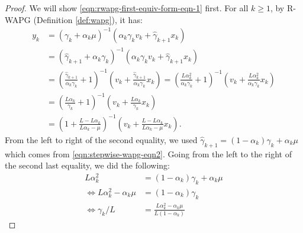 \documentclass[12pt]{article}
\begin{document}
        \begin{proof}
            {We will show \eqref{eqn:rwapg-first-equiv-form-eqn-1} first.}
            For all $k \ge 1$, by R-WAPG (Definition \ref{def:wapg}), it has:
            \begin{align*}
                y_{k} &=
                (\gamma_k + \alpha_k \mu)^{-1}
                (\alpha_k \gamma_k v_k + \hat \gamma_{k + 1}x_k)
                \\
                &=
                (\hat \gamma_{k + 1} + \alpha_k \gamma_k)^{-1}
                (\alpha_k \gamma_k v_k + \hat \gamma_{k + 1}x_k)
                \\
                &=
                \left(
                    \frac{\hat \gamma_{k + 1}}{\alpha_k\gamma_k} + 1
                \right)^{-1}
                \left(
                    v_k + \frac{\hat \gamma_{k + 1}}{\alpha_k \gamma_k} x_k
                \right)
                =
                \left(
                    \frac{L\alpha_k^2}{\alpha_k\gamma_k} + 1
                \right)^{-1}
                \left(
                    v_k + \frac{L\alpha_k^2}{\alpha_k \gamma_k} x_k
                \right)
                \\
                &=
                \left(
                    \frac{L\alpha_k}{\gamma_k} + 1
                \right)^{-1}
                \left(
                    v_k + \frac{L\alpha_k}{ \gamma_k} x_k
                \right)
                \\
                &=
                \left(
                    1 + \frac{L - L \alpha_k}{L \alpha_k - \mu}
                \right)^{-1}
                \left(
                    v_k +
                    \frac{L - L \alpha_k}{L \alpha_k - \mu} x_k
                \right).
            \end{align*}
            From the left to right of the second equality, we used $\hat \gamma_{k + 1} = (1 - \alpha_k)\gamma_k + \alpha_k\mu$ which comes from \eqref{eqn:stepwise-wapg-eqn2}.
            Going from the left to the right of the second last equality, we did the following:
            \begin{align*}
                L\alpha_k^2 &=
                (1 - \alpha_k)\gamma_k + \alpha_k \mu
                \\
                \iff
                L \alpha_k^2 - \alpha_k\mu &=
                (1 - \alpha_k)\gamma_k
                \\
                \iff
                \gamma_k/L
                &=
                \frac{L \alpha_k^2 - \alpha_k\mu}{L (1 - \alpha_k)}

\end{align*}
\end{proof}
\end{document}
